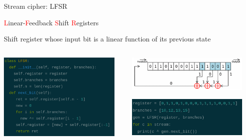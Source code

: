 \begin{frame}{Stream cipher: LFSR}

  \textcolor{red}{L}inear-\textcolor{red}{F}eedback \textcolor{red}{S}hift \textcolor{red}{R}egisters
  
  \medskip

  Shift register whose input bit is a linear function of its previous state
   
  \medskip
  
  \begin{columns}
  \begin{column}{0.5\textwidth}
    \centerline{\includegraphics[width=6cm]{img/LFSR-code.png}}
  \end{column}
  \begin{column}{0.5\textwidth}
    \centerline{\includegraphics[width=6cm]{img/lfsr.png}}

    \medskip

    \centerline{\includegraphics[width=6cm]{img/LFSR-gen.png}}
  \end{column}
  \end{columns}

\end{frame}
